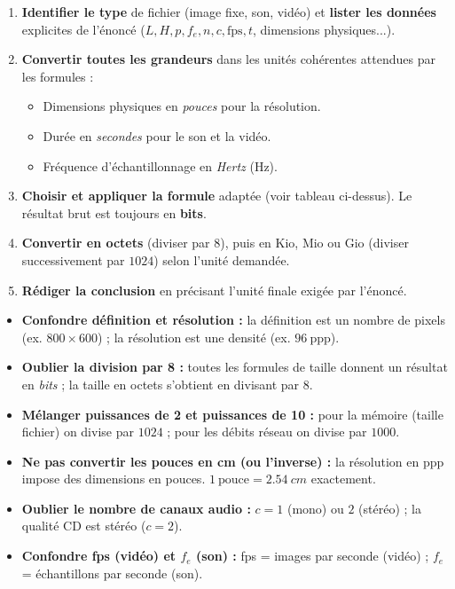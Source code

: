 \documentclass[11pt]{article}
\begin{document}
\begin{methode}
\begin{enumerate}
  \item \textbf{Identifier le type} de fichier (image fixe, son, vidéo) et \textbf{lister les données} explicites de l'énoncé ($L, H, p, f_e, n, c, \text{fps}, t$, dimensions physiques...).
  \item \textbf{Convertir toutes les grandeurs} dans les unités cohérentes attendues par les formules :
        \begin{itemize}
          \item Dimensions physiques en \emph{pouces} pour la résolution.
          \item Durée en \emph{secondes} pour le son et la vidéo.
          \item Fréquence d'échantillonnage en \emph{Hertz} (Hz).
        \end{itemize}
  \item \textbf{Choisir et appliquer la formule} adaptée (voir tableau ci-dessus). Le résultat brut est toujours en \textbf{bits}.
  \item \textbf{Convertir en octets} (diviser par $8$), puis en Kio, Mio ou Gio (diviser successivement par $1024$) selon l'unité demandée.
  \item \textbf{Rédiger la conclusion} en précisant l'unité finale exigée par l'énoncé.
\end{enumerate}
\end{methode}

\begin{attention}
\begin{itemize}
  \item \textbf{Confondre définition et résolution :} la définition est un nombre de pixels (ex. $800 \times 600$) ; la résolution est une densité (ex. $96~\text{ppp}$).
  \item \textbf{Oublier la division par 8 :} toutes les formules de taille donnent un résultat en \emph{bits} ; la taille en octets s'obtient en divisant par $8$.
  \item \textbf{Mélanger puissances de 2 et puissances de 10 :} pour la mémoire (taille fichier) on divise par $1024$ ; pour les débits réseau on divise par $1000$.
  \item \textbf{Ne pas convertir les pouces en cm (ou l'inverse) :} la résolution en ppp impose des dimensions en pouces. $1~\text{pouce} = \SI{2,54}{cm}$ exactement.
  \item \textbf{Oublier le nombre de canaux audio :} $c = 1$ (mono) ou $2$ (stéréo) ; la qualité CD est stéréo ($c=2$).
  \item \textbf{Confondre fps (vidéo) et $f_e$ (son) :} fps = images par seconde (vidéo) ; $f_e$ = échantillons par seconde (son).
\end{itemize}
\end{attention}
\end{document}
